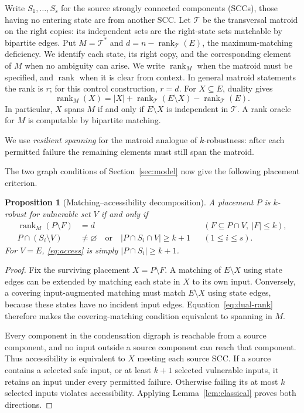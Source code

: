 \documentclass[11pt]{article}
\newtheorem{proposition}[theorem]{Proposition}
\theoremstyle{definition}
\theoremstyle{remark}\newtheorem{remark}[theorem]{Remark}
\DeclareMathOperator{\rk}{rank}
\begin{document}
Write $S_1,\ldots,S_s$ for the source strongly connected components (SCCs),
those having no entering state arc from another SCC. Let $\mathcal T$ be the transversal matroid on the right
copies: its independent sets are the right-state sets matchable by
bipartite edges. Put $M=\mathcal T^*$ and
$d=n-\rk_{\mathcal T}(E)$, the maximum-matching deficiency.
We identify each state, its right copy, and the corresponding element of
$M$ when no ambiguity can arise. We write $\rk_M$ when the matroid
must be specified, and $\rk$ when it is clear from context.
In general matroid statements the rank is $r$; for this control
construction, $r=d$.
For $X\subseteq E$, duality gives
\begin{equation}\label{eq:dual-rank}
 \rk_M(X)=|X|+\rk_{\mathcal T}(E\setminus X)-\rk_{\mathcal T}(E).
\end{equation}
In particular, $X$ spans $M$ if and only if $E\setminus X$ is independent
in $\mathcal T$. A rank oracle for $M$ is computable by bipartite matching.

We use \emph{resilient spanning} for the matroid analogue of
$k$-robustness: after each permitted failure the remaining elements
must still span the matroid.

The two graph conditions of Section~\ref{sec:model} now give the
following placement criterion.
\begin{proposition}[Matching--accessibility decomposition]\label{prop:control}
A placement $P$ is $k$-robust for vulnerable set $V$ if and only if
\begin{align}
 \rk_M(P\setminus F)&=d
 &&(F\subseteq P\cap V,\ |F|\le k),\label{eq:control}\\
 P\cap(S_i\setminus V)&\ne\varnothing
 \quad\text{or}\quad |P\cap S_i\cap V|\ge k+1
 &&(1\le i\le s).\label{eq:access}
\end{align}
For $V=E$, \eqref{eq:access} is simply $|P\cap S_i|\ge k+1$.
\end{proposition}
\begin{proof}
Fix the surviving placement $X=P\setminus F$.
A matching of $E\setminus X$ using state edges can be extended by
matching each state in $X$ to its own input. Conversely, a covering
input-augmented matching must match $E\setminus X$ using state edges,
because these states have no incident input edges. Equation~\eqref{eq:dual-rank}
therefore makes the covering-matching condition equivalent to spanning
in $M$.

Every component in the condensation digraph is reachable from a
source component, and no input outside a source component can reach
that component. Thus accessibility is equivalent to $X$ meeting each
source SCC. If a source contains a selected safe input, or at least
$k+1$ selected vulnerable inputs, it retains an input under every
permitted failure. Otherwise failing its at most $k$ selected inputs
violates accessibility. Applying Lemma~\ref{lem:classical} proves both
directions.
\end{proof}
\end{document}

